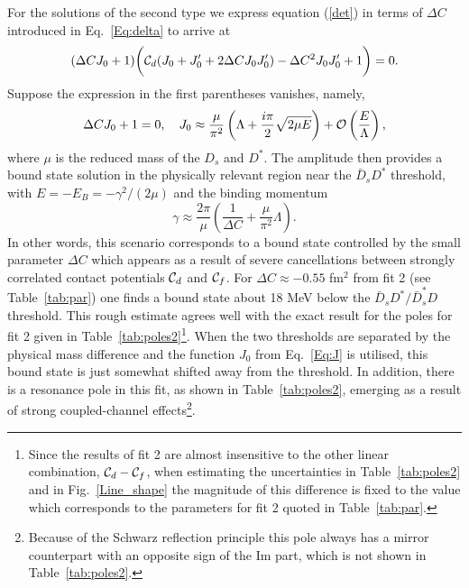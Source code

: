 \documentclass[preprint,12pt,3p]{elsarticle}
\newcommand{\be}{\begin{equation}}
\newcommand{\ee}{\end{equation}}
\begin{document}
For the solutions of the second type we express equation (\ref{det}) in terms of $\Delta C$ introduced in Eq.~\eqref{Eq:delta} to arrive at
\be
(\Delta C J_0+1)\biggl ({\cal C}_d (J_0+J_0' + 2\Delta C J_0 J_0')-\Delta C^2 J_0 J_0'+1\biggr)=0.
\label{Eq:T}
\ee
Suppose the expression in the first parentheses vanishes, namely, 
\be\label{eq:bsfit2}
\Delta C J_0+1=0, \quad J_0\approx\frac{\mu}{\pi^2}\left(\Lambda+\frac{i\pi}{2}\sqrt{2\mu E}\right) + {\cal O}\left(\frac{E}{\Lambda}\right),
\ee
where $\mu$ is the reduced mass of the $D_s$ and $ D^*$. The amplitude then provides a bound state solution in the physically relevant region near the $\bar{D}_s D^*$ threshold, with $E=-E_B=-\gamma^2/(2\mu)$ and the binding momentum
\be
\gamma\approx\frac{2\pi}{\mu} \left( \frac1{\Delta C} +\frac{\mu}{\pi^2}\Lambda\right).
\ee
In other words, this scenario corresponds to a bound state controlled by the small parameter $\Delta C$ which appears as a result of severe cancellations between strongly correlated contact potentials ${\cal C}_d$ and ${\cal C}_f$. For $\Delta C \approx -0.55$ fm$^2$ from fit 2 (see Table~\ref{tab:par}) one finds a bound state about 18 MeV below the $\bar{D}_s D^*/\bar{D}_s^* D$ threshold. This rough estimate agrees well with the exact result for the poles for fit 2 given in Table~\ref{tab:poles2}\footnote{Since the results of fit 2 are almost insensitive to the other linear combination, ${\cal C}_d-{\cal C}_f$, when estimating the uncertainties in Table~\ref{tab:poles2} and in Fig.~\ref{Line_shape} the magnitude of this difference is fixed to the value which corresponds to the parameters for fit 2 quoted in Table~\ref{tab:par}.}. When the two thresholds are separated by the physical mass difference and the function $J_0$ from Eq.~\eqref{Eq:J} is utilised, this bound state is just somewhat shifted away from the threshold. 
In addition, there is a resonance pole in this fit, as shown in Table~\ref{tab:poles2}, emerging as a result of strong coupled-channel effects\footnote{Because of the Schwarz reflection principle this pole always has a mirror counterpart with an opposite sign of the Im part, which is not shown in Table~\ref{tab:poles2}.}. 
\end{document}
